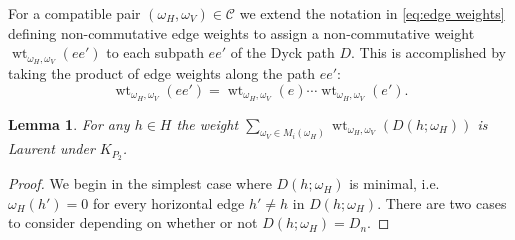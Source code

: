 \documentclass{amsart}
\newtheorem{lemma}[theorem]{Lemma}
\newcommand{\cC}{\mathcal{C}}
\newcommand{\wt}{\operatorname{wt}}
\begin{document}
 \bigskip

 For a compatible pair $(\omega_H,\omega_V)\in\cC$ we extend the notation in \eqref{eq:edge weights} defining non-commutative edge weights to assign a non-commutative weight $\wt_{\omega_H,\omega_V}(ee')$ to each subpath $ee'$ of the Dyck path $D$.  This is accomplished by taking the product of edge weights along the path $ee'$:
 \begin{equation}\label{eq:path weights}
  \wt_{\omega_H,\omega_V}(ee')=\wt_{\omega_H,\omega_V}(e)\cdots\wt_{\omega_H,\omega_V}(e').
 \end{equation}
 \begin{lemma}
  For any $h\in H$ the weight $\sum\limits_{\omega_V\in M_i(\omega_H)}\wt_{\omega_H,\omega_V}(D(h;\omega_H))$ is Laurent under $K_{P_2}$.
 \end{lemma}
 \begin{proof}
  We begin in the simplest case where $D(h;\omega_H)$ is minimal, i.e. $\omega_H(h')=0$ for every horizontal edge $h'\ne h$ in $D(h;\omega_H)$.  There are two cases to consider depending on whether or not $D(h;\omega_H)=D_n$.   
  

\end{proof}
\end{document}
